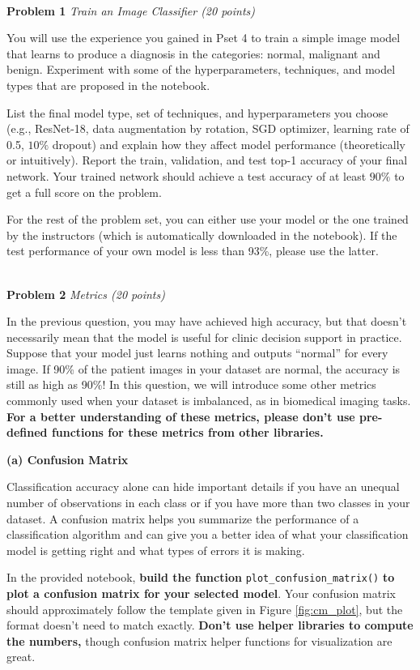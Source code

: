 \documentclass[11pt]{article}
\newcommand{\hwproblem}[2] {\noindent \\ {\bf #1} {\it #2}}
\begin{document}
\hwproblem{Problem 1}{Train an Image Classifier (20 points) }

You will use the experience you gained in Pset 4 to train a simple image model that learns to produce a diagnosis in the categories: normal, malignant and benign. Experiment with some of the hyperparameters, techniques, and model types that are proposed in the notebook. 

List the final model type, set of techniques, and hyperparameters you choose (e.g., ResNet-18, data augmentation by rotation, SGD optimizer, learning rate of 0.5, $10\%$ dropout) and explain how they affect model performance (theoretically or intuitively). Report the train, validation, and test top-1 accuracy of your final network. Your trained network should achieve a test accuracy of at least $90\%$ to get a full score on the problem. 


For the rest of the problem set, you can either use your model or the one trained by the instructors (which is automatically downloaded in the notebook). If the test performance of your own model is less than 93\%, please use the latter. 

\hwproblem{Problem 2}{ Metrics (20 points)}

In the previous question, you may have achieved high accuracy, but that doesn't necessarily mean that the model is useful for clinic decision support in practice. Suppose that your model just learns nothing and outputs ``normal'' for every image. If 90\% of the patient images in your dataset are normal, the accuracy is still as high as 90\%! In this question, we will introduce some other metrics commonly used when your dataset is imbalanced, as in biomedical imaging tasks. \textbf{For a better understanding of these metrics, please don't use pre-defined functions for these metrics from other libraries.} 

\textbf{(a) Confusion Matrix}

Classification accuracy alone can hide important details if you have an unequal number of observations in each class or if you have more than two classes in your dataset. A confusion matrix helps you summarize the performance of a classification algorithm and can give you a better idea of what your classification model is getting right and what types of errors it is making. 

In the provided notebook, \textbf{build the function} \texttt{plot\_confusion\_matrix()} \textbf{to plot a confusion matrix for your selected model}. Your confusion matrix should approximately follow the template given in Figure \ref{fig:cm_plot}, but the format doesn't need to match exactly. \textbf{Don't use helper libraries to compute the numbers,} though confusion matrix helper functions for visualization are great. 
\end{document}
